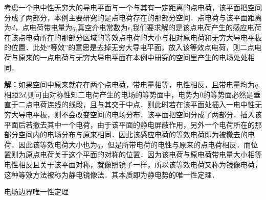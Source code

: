 \begin{example}{}
考虑一个电中性无穷大的导电平面与一个与其有一定距离的点电荷，该平面把空间分成了两部分，本例主要研究的是点电荷存在的那部分空间．点电荷与该平面距离为$d$，点电荷带电量为$q$,真空介电常数为$\epsilon$,我们要求解的是该点电荷产生的感应电荷在该点电荷所在的那部分区域的等效点电荷的大小与相对原电荷和无穷大导电平板的位置．此处“等效”的意思是去掉无穷大导电平面，放入该等效点电荷，则二点电荷与原来的一点电荷与无穷大导电平面在本例中研究的空间里产生的电场处处相同．

\textbf{解：}如果空间中原来就存在两个点电荷，带电量相等，电性相反，且带电量均为$q$,相距$2d$,则可由对称性知二电荷产生的电场的等势面中，电势为$0$的等势面必然是垂直于二点电荷连线的线段，且与其交于中点．则此时若在该平面处插入一电中性无穷大导电平板，则不会改变空间的电场分布．该平面把空间分成了两部分．插入该平面后若撤去其中一个电荷，由于该平面的静电屏蔽作用，另外一个电荷所在的那部分空间内的电场分布与原来相同．因此该感应电荷的等效电荷即为被撤去的电荷．因此该等效电荷大小也为$q$，但是所带电荷的电性与原来的点电荷相反．而位置则为原点电荷关于这个平面的对称的位置．因为该电荷与原电荷带电量大小相等电性相反且关于该平面对称，就像照镜子一样，所以该等效电荷又称为镜像电荷，这种等效方法被称为静电镜像法．其本质即为静电势的唯一性定理．
\end{example}

\begin{theorem}{电场边界唯一性定理}

\end{theorem}
